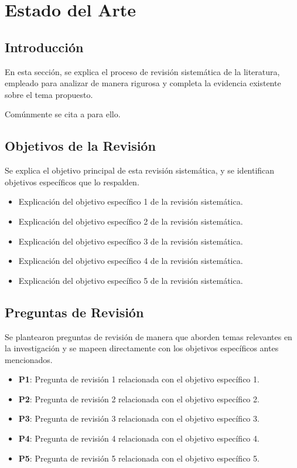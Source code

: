 \section{Estado del Arte}
\label{sec:sota}

\subsection{Introducción}
\label{subsec:sota-intro}

En esta sección, se explica el proceso de revisión sistemática de la literatura, empleado para
analizar de manera rigurosa y completa la evidencia existente sobre el tema propuesto.

Comúnmente se cita a \textcite{kitchenham2004procedures} para ello.

\subsection{Objetivos de la Revisión}
\label{subsec:objetivos-revision}

Se explica el objetivo principal de esta revisión sistemática, y se identifican objetivos específicos que
lo respalden.

\begin{itemize}
      \item Explicación del objetivo específico 1 de la revisión sistemática.
      \item Explicación del objetivo específico 2 de la revisión sistemática.
      \item Explicación del objetivo específico 3 de la revisión sistemática.
      \item Explicación del objetivo específico 4 de la revisión sistemática.
      \item Explicación del objetivo específico 5 de la revisión sistemática.
\end{itemize}

\subsection{Preguntas de Revisión}
\label{subsec:preguntas-revision}

Se plantearon preguntas de revisión de manera que aborden temas relevantes en la investigación y
se mapeen directamente con los objetivos específicos antes mencionados.

\begin{itemize}
      \item \textbf{P1}: Pregunta de revisión 1 relacionada con el objetivo específico 1.
      \item \textbf{P2}: Pregunta de revisión 2 relacionada con el objetivo específico 2.
      \item \textbf{P3}: Pregunta de revisión 3 relacionada con el objetivo específico 3.
      \item \textbf{P4}: Pregunta de revisión 4 relacionada con el objetivo específico 4.
      \item \textbf{P5}: Pregunta de revisión 5 relacionada con el objetivo específico 5.
\end{itemize}

